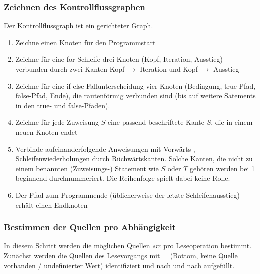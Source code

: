 \documentclass[a4paper,10pt]{article}
\begin{document}
\subsubsection{Zeichnen des Kontrollflussgraphen}
Der Kontrollflussgraph ist ein gerichteter Graph.
\begin{enumerate}
    \item Zeichne einen Knoten für den Programmstart
    \item Zeichne für eine for-Schleife drei Knoten (Kopf, Iteration, Ausstieg) verbunden durch zwei Kanten Kopf $\rightarrow$ Iteration und Kopf $\rightarrow$ Ausstieg
    \item Zeichne für eine if-else-Fallunterscheidung vier Knoten (Bedingung, true-Pfad, false-Pfad, Ende), die rautenförmig verbunden sind (bis auf weitere Satements in den true- und false-Pfaden).
    \item Zeichne für jede Zuweisung $S$ eine passend beschriftete Kante $S$, die in einem neuen Knoten endet
    \item Verbinde aufeinanderfolgende Anweisungen mit Vorwärts-, Schleifenwiederholungen durch Rüchwärtskanten.
        Solche Kanten, die nicht zu einem benannten (Zuweisungs-) Statement wie $S$ oder $T$ gehören werden bei 1 beginnend durchnummeriert. Die Reihenfolge spielt dabei keine Rolle.
    \item Der Pfad zum Programmende (üblicherweise der letzte Schleifenausstieg) erhält einen Endknoten
\end{enumerate}

\subsubsection{Bestimmen der Quellen pro Abhängigkeit}
In diesem Schritt werden die möglichen Quellen \textit{src} pro Leseoperation bestimmt. Zunächst werden die Quellen des Lesevorgangs mit $\bot$ (Bottom, keine Quelle vorhanden / undefinierter Wert) identifiziert und nach und nach aufgefüllt.
\end{document}
